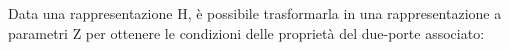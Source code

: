 \documentclass{article}
\numberwithin{equation}{subsection}
\begin{document}
Data una rappresentazione H, è possibile trasformarla in una rappresentazione a parametri Z per ottenere le condizioni delle proprietà del due-porte associato:
%
%
\end{document}
